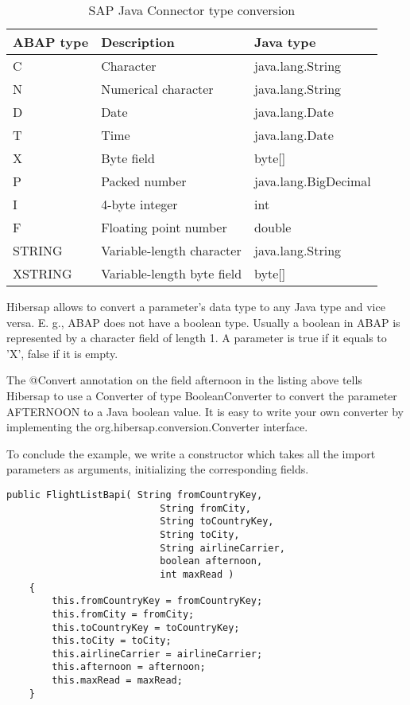 \begin{table}
  \centering
  \begin{tabular}{lll} \toprule
    \textbf{ABAP type} & \textbf{Description}       & \textbf{Java type} \\ \midrule
    C                  & Character                  & java.lang.String \\
    N                  & Numerical character        & java.lang.String \\
    D                  & Date                       & java.lang.Date \\
    T                  & Time                       & java.lang.Date \\
    X                  & Byte field                 & byte[] \\
    P                  & Packed number              & java.lang.BigDecimal \\
    I                  & 4-byte integer             & int \\
    F                  & Floating point number      & double \\
    STRING             & Variable-length character  & java.lang.String \\
    XSTRING            & Variable-length byte field & byte[] \\ \bottomrule
  \end{tabular}
  \caption{SAP Java Connector type conversion}
  \label{tab:JCoConversion}
\end{table}

Hibersap allows to convert a parameter's data type to any Java type and vice versa.
E. g., ABAP does not have a boolean type. Usually a boolean in ABAP is represented by a
character field of length 1. A parameter is true if it equals to 'X', false if it is empty.

The @Convert annotation on the field afternoon in the listing above tells Hibersap
to use a Converter of type BooleanConverter to convert the parameter AFTERNOON to a
Java boolean value.
It is easy to write your own converter by implementing the org.hibersap.conversion.Converter interface.

To conclude the example, we write a constructor which takes all the import parameters as arguments,
initializing the corresponding fields.

\begin{Verbatim}[frame=single,label=The constructor,samepage=true]
    public FlightListBapi( String fromCountryKey,
                           String fromCity,
                           String toCountryKey,
                           String toCity,
                           String airlineCarrier,
                           boolean afternoon,
                           int maxRead )
    {
        this.fromCountryKey = fromCountryKey;
        this.fromCity = fromCity;
        this.toCountryKey = toCountryKey;
        this.toCity = toCity;
        this.airlineCarrier = airlineCarrier;
        this.afternoon = afternoon;
        this.maxRead = maxRead;
    }
\end{Verbatim}

